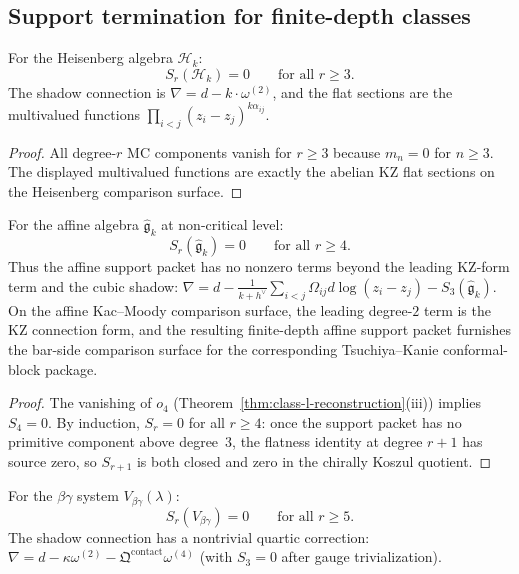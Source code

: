 \subsection{Support termination for finite-depth classes}

\begin{proposition}
For the Heisenberg algebra $\mathcal{H}_k$:
\[
S_r(\mathcal{H}_k) = 0 \qquad \text{for all } r \geq 3.
\]
The shadow connection is $\nabla = d - k \cdot \omega^{(2)}$, and the flat sections
are the multivalued functions $\prod_{i < j} (z_i - z_j)^{k \alpha_{ij}}$.
\end{proposition}

\begin{proof}
All degree-$r$ MC components vanish for $r \geq 3$ because $m_n = 0$ for $n \geq 3$.
The displayed multivalued functions are exactly the abelian KZ flat sections on
the Heisenberg comparison surface.
\end{proof}

\begin{proposition}
For the affine algebra $\widehat{\mathfrak{g}}_k$ at non-critical level:
\[
S_r(\widehat{\mathfrak{g}}_k) = 0 \qquad \text{for all } r \geq 4.
\]
Thus the affine support packet has no nonzero terms beyond the
leading KZ-form term and the cubic shadow:
$\nabla = d - \frac{1}{k+h^\vee}\sum_{i<j} \Omega_{ij} d\log(z_i - z_j)
- S_3(\widehat{\mathfrak{g}}_k)$.
On the affine Kac--Moody comparison surface, the leading degree-$2$
term is the KZ connection form, and the resulting finite-depth affine
support packet furnishes the bar-side comparison surface for the
corresponding Tsuchiya--Kanie conformal-block package.
\end{proposition}

\begin{proof}
The vanishing of $o_4$ (Theorem~\ref{thm:class-l-reconstruction}(iii)) implies
$S_4 = 0$. By induction, $S_r = 0$ for all $r \geq 4$: once the support packet has
no primitive component above degree~$3$,
the flatness identity at degree $r+1$ has source zero, so $S_{r+1}$ is both closed and
zero in the chirally Koszul quotient.
\end{proof}

\begin{proposition}
For the $\beta\gamma$ system $V_{\beta\gamma}(\lambda)$:
\[
S_r(V_{\beta\gamma}) = 0 \qquad \text{for all } r \geq 5.
\]
The shadow connection has a nontrivial quartic correction:
$\nabla = d - \kappa \omega^{(2)} - \mathfrak{Q}^{\mathrm{contact}} \omega^{(4)}$
(with $S_3 = 0$ after gauge trivialization).
\end{proposition}

